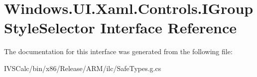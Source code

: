 \hypertarget{interface_windows_1_1_u_i_1_1_xaml_1_1_controls_1_1_i_group_style_selector}{}\section{Windows.\+U\+I.\+Xaml.\+Controls.\+I\+Group\+Style\+Selector Interface Reference}
\label{interface_windows_1_1_u_i_1_1_xaml_1_1_controls_1_1_i_group_style_selector}


The documentation for this interface was generated from the following file\+:\begin{DoxyCompactItemize}
\item 
I\+V\+S\+Calc/bin/x86/\+Release/\+A\+R\+M/ilc/Safe\+Types.\+g.\+cs\end{DoxyCompactItemize}
